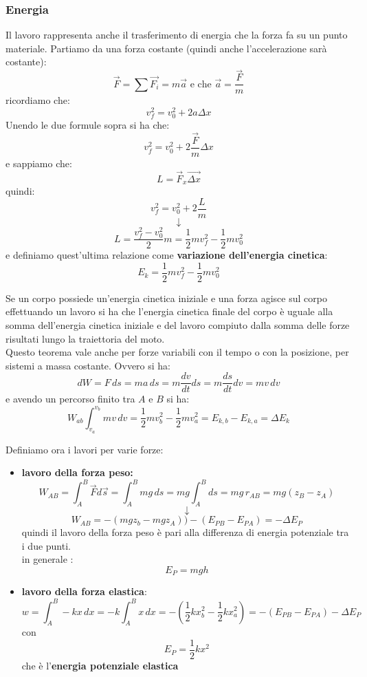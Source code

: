 \documentclass[a4paper,12pt, oneside]{book}
\begin{document}
\subsubsection{Energia}
Il lavoro rappresenta anche il trasferimento di energia che la forza fa su un punto materiale. Partiamo da una forza costante (quindi anche l'accelerazione sarà costante):
$$\vec{F}=\sum\vec{F_i}=m\vec{a} \mbox{ e che } \vec{a}=\frac{\vec{F}}{m}$$
ricordiamo che:
$$v_f^2=v_0^2+2a\Delta x$$
Unendo le due formule sopra si ha che:
$$v_f^2=v_0^2+2\frac{\vec{F}}{m}\Delta x$$
e sappiamo che:
$$L=\vec{F}_x\vec{\Delta x}$$
quindi:
$$v_f^2=v_0^2+2\frac{L}{m}$$
$$\downarrow$$
$$L=\frac{v_f^2-v_0^2}{2}m=\frac{1}{2}mv_f^2-\frac{1}{2}mv_0^2$$
e definiamo quest'ultima relazione come \textbf{variazione dell'energia cinetica}:
$$E_k=\frac{1}{2}mv_f^2-\frac{1}{2}mv_0^2$$
\begin{teorema}
	Se un corpo possiede un'energia cinetica iniziale e una forza agisce sul corpo effettuando un lavoro si ha che l'energia cinetica finale del corpo è uguale alla somma dell'energia cinetica iniziale e del lavoro compiuto dalla somma delle forze risultati lungo la traiettoria del moto.\\
	Questo teorema vale anche per forze variabili con il tempo o con la posizione, per sistemi a massa costante. Ovvero si ha:
	$$dW=F\,ds=ma\,ds=m\frac{dv}{dt}ds=m\frac{ds}{dt}dv=mv\, dv$$
	e avendo un percorso finito tra $A$ e $B$ si ha:
	$$W_{ab}\int_{v_a}^{v_b}mv\,dv=\frac{1}{2}mv_b^2-\frac{1}{2}mv_a^2=E_{k,b}-E_{k,a}=\Delta E_k$$
\end{teorema}
Definiamo ora i lavori per varie forze:
\begin{itemize}
	\item \textbf{lavoro della forza peso:}
	      $$W_{AB}=\int_A^B \vec{F}d\vec{s}=\int_A^B mg\, ds=mg\int_A^B ds=mg\,r_{AB}=mg(z_B-z_A)$$
	      $$\downarrow$$
	      $$W_{AB}=-(mgz_b-mgz_A))-(E_{PB}-E_{PA})=-\Delta E_P$$
	      quindi il lavoro della forza peso è pari alla differenza di energia potenziale tra i due punti.\\
	      in generale :
	      $$E_P=mgh$$
	\item \textbf{lavoro della forza elastica}:
	      $$w=\int_A^B -kx\,dx=-k\int_A^Bx\,dx=-\left(\frac{1}{2}kx_b^2-\frac{1}{2}kx_a^2\right)=-(E_{PB}-E_{PA})-\Delta E_P$$
	      con
	      $$E_P=\frac{1}{2}kx^2$$
	      che è l'\textbf{energia potenziale elastica}
\end{itemize}
\end{document}
